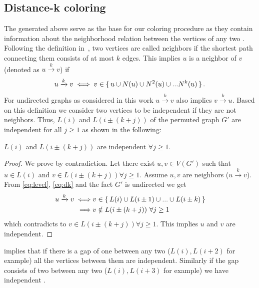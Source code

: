  \subsection{Distance-k coloring} \label{subsec:DK}
 The \levels generated above serve as the base for our \DK coloring procedure as they contain information about the neighborhood relation between the vertices of any two \levels. Following the definition in~\cite{dist_k_def}, two vertices are called \DK neighbors if the shortest path connecting them consists of at most $k$ edges.
This implies $u$ is a \DK neighbor of $v$ (denoted as $u\xrightarrow{k}v$)  if
 \begin{equation}\label{eq:dk}
	  u\xrightarrow{k}v  \iff  v \in \set{ u \cup N(u) \cup N^2(u) \cup ... N^k(u) }.	 
 \end{equation}
 For undirected graphs as considered in this work  $u\xrightarrow{k}v$ also implies $v\xrightarrow{k}u$. Based on this definition we consider two vertices to be \DK independent if they are not \DK neighbors. Thus,  \levels $L(i)$ and $L(i\pm(k+j))$  of the permuted graph $G'$ are \DK independent for all $j\geq1$ as shown in the following:
  \begin{corollary}\label{corollary_dk}
   $L(i)$ and $L(i\pm(k+j))$ are \DK independent $\forall j\geq1$. 
  \end{corollary}
  \begin{proof}
  	We prove by contradiction. Let there exist $u,v \in V(G')$ such that  $u \in L(i)$ and $v \in  L(i \pm (k+j)) \forall j\geq1$. Assume $u,v$ are \DK neighbors ($u\xrightarrow{k}v$). From \cref{eq:level}, \cref{eq:dk} and the fact $G'$ is undirected we get 
  	\begin{align*}
	  	u\xrightarrow{k}v \iff & v \in \set{L(i) \cup L(i \pm 1) \cup ... \cup L(i \pm k)} \\
	  	\implies & v \notin L(i \pm (k+j)) \text{  } \forall j \geq 1
  	\end{align*}
  	which contradicts to $v \in L(i \pm (k+j) ) \forall j \geq 1$. This implies $u$ and $v$ are \DK independent.
  \end{proof}

 implies that if there is a gap of \emph{\atleast} one \level between any two \levels ($L(i), L(i+2)$ for example) all the vertices between them are \DONE independent. Similarly if the gap consists of \emph{\atleast} two \levels between any two \levels ($L(i), L(i+3)$ for example) we have \DTWO independent \levels.
  
